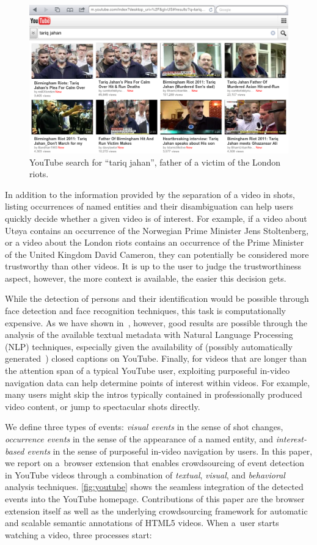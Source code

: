 \documentclass[runningheads,a4paper]{llncs}
\begin{document}
\begin{figure}[htb!]
  \begin{center}
   \includegraphics[width=0.7\linewidth]{./resources/tariq}
  \end{center}  
  \caption{YouTube search for ``tariq jahan'', father of a victim of the London riots.}
  \label{fig:thumbnails}
\end{figure}

In addition to the information provided by the separation of a video in shots, listing occurrences of named entities and their disambiguation can help users quickly decide whether a given video is of interest. For example, if a video about Ut\o ya contains an occurrence of the Norwegian Prime Minister Jens Stoltenberg, or a video about the London riots contains an occurrence of the Prime Minister of the United Kingdom David Cameron, they can potentially be considered more trustworthy than other videos. It is up to the user to judge the trustworthiness aspect, however, the more context is available, the easier this decision gets.

While the detection of persons and their identification would be possible through face detection and face recognition techniques, this task is computationally expensive. As we have shown in~\cite{semwebvid}, however, good results are possible through the analysis of the available textual metadata with Natural Language Processing (NLP) techniques, especially given the availability of (possibly automatically generated~\cite{youtubecaptions}) closed captions on YouTube. Finally, for videos that are longer than the attention span of a typical YouTube user, exploiting purposeful in-video navigation data can help determine points of interest within videos. For example, many users might skip the intros typically contained in professionally produced video content, or jump to spectacular shots directly.

We define three types of events: \emph{visual events} in the sense of shot changes, \emph{occurrence events} in the sense of the appearance of a named entity, and \emph{interest-based events} in the sense of purposeful in-video navigation by users. In this paper, we report on a~browser extension that enables crowdsourcing  of event detection in YouTube videos through a combination of \emph{textual}, \emph{visual}, and \emph{behavioral} analysis techniques. \autoref{fig:youtube} shows the seamless integration of the detected events into the YouTube homepage. Contributions of this paper are the browser extension itself as well as the underlying crowdsourcing framework for automatic and scalable semantic annotations of HTML5 videos. When a~user starts watching a video, three processes start:
\end{document}
